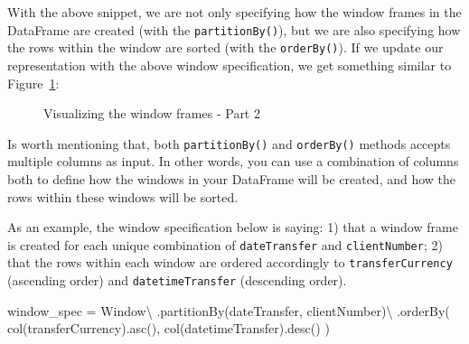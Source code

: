 \documentclass[
  11pt,
  letterpaper,
  DIV=11,
  numbers=noendperiod]{scrreprt}
\newenvironment{Shaded}{\begin{snugshade}}{\end{snugshade}}
\newcommand{\NormalTok}[1]{\textcolor[rgb]{0.00,0.23,0.31}{#1}}
\newcommand{\OperatorTok}[1]{\textcolor[rgb]{0.37,0.37,0.37}{#1}}
\newcommand{\StringTok}[1]{\textcolor[rgb]{0.13,0.47,0.30}{#1}}
\begin{document}
With the above snippet, we are not only specifying how the window frames
in the DataFrame are created (with the \texttt{partitionBy()}), but we
are also specifying how the rows within the window are sorted (with the
\texttt{orderBy()}). If we update our representation with the above
window specification, we get something similar to
Figure~\ref{fig-window-spec2}:

\begin{figure}


\caption{\label{fig-window-spec2}Visualizing the window frames - Part 2}

\end{figure}%

Is worth mentioning that, both \texttt{partitionBy()} and
\texttt{orderBy()} methods accepts multiple columns as input. In other
words, you can use a combination of columns both to define how the
windows in your DataFrame will be created, and how the rows within these
windows will be sorted.

As an example, the window specification below is saying: 1) that a
window frame is created for each unique combination of
\texttt{dateTransfer} and \texttt{clientNumber}; 2) that the rows within
each window are ordered accordingly to \texttt{transferCurrency}
(ascending order) and \texttt{datetimeTransfer} (descending order).

\begin{Shaded}
\begin{Highlighting}[]
\NormalTok{window\_spec }\OperatorTok{=}\NormalTok{ Window}\OperatorTok{\textbackslash{}}
\NormalTok{    .partitionBy(}\StringTok{\textquotesingle{}dateTransfer\textquotesingle{}}\NormalTok{, }\StringTok{\textquotesingle{}clientNumber\textquotesingle{}}\NormalTok{)}\OperatorTok{\textbackslash{}}
\NormalTok{    .orderBy(}
\NormalTok{        col(}\StringTok{\textquotesingle{}transferCurrency\textquotesingle{}}\NormalTok{).asc(),}
\NormalTok{        col(}\StringTok{\textquotesingle{}datetimeTransfer\textquotesingle{}}\NormalTok{).desc()}
\NormalTok{    )}
\end{Highlighting}
\end{Shaded}
\end{document}

